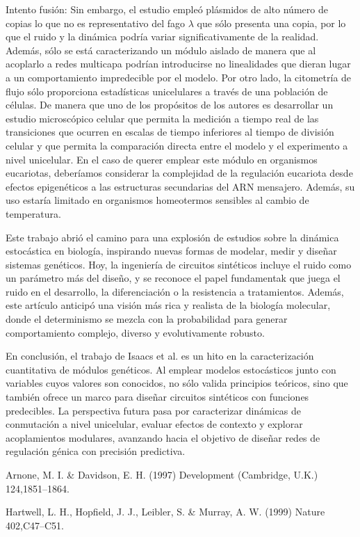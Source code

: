 \documentclass[nochap]{config/ejercicios}
\begin{document}
Intento fusión:
Sin embargo, el estudio empleó plásmidos de alto número de copias lo que no es representativo del fago $\lambda$ que sólo presenta una copia, por lo que el ruido y la dinámica podría variar significativamente de la realidad. Además, sólo se está caracterizando un módulo aislado de manera que al acoplarlo a redes multicapa podrían introducirse no linealidades que dieran lugar a un comportamiento impredecible por el modelo. Por otro lado, la citometría de flujo sólo proporciona estadísticas unicelulares a través de una población de células. De manera que uno de los propósitos de los autores es desarrollar un estudio microscópico celular que permita la medición a tiempo real de las transiciones que ocurren en escalas de tiempo inferiores al tiempo de división celular y que permita la comparación directa entre el modelo y el experimento a nivel unicelular. En el caso de querer emplear este módulo en organismos eucariotas, deberíamos considerar la complejidad de la regulación eucariota desde efectos epigenéticos a las estructuras secundarias del ARN mensajero. Además, su uso estaría limitado en organismos homeotermos sensibles al cambio de temperatura.


Este trabajo abrió el camino para una explosión de estudios sobre la dinámica estocástica en biología, inspirando nuevas formas de modelar, medir y diseñar sistemas genéticos. Hoy, la ingeniería de circuitos sintéticos incluye el ruido como un parámetro más del diseño, y se reconoce el papel fundamentak que juega el ruido en el desarrollo, la diferenciación o la resistencia a tratamientos. Además, este artículo anticipó una visión más rica y realista de la biología molecular, donde el determinismo se mezcla con la probabilidad para generar comportamiento complejo, diverso y evolutivamente robusto.


En conclusión, el trabajo de Isaacs et al. es un hito en la caracterización cuantitativa de módulos genéticos. Al emplear modelos estocásticos junto con variables cuyos valores son conocidos, no sólo valida principios teóricos, sino que también ofrece un marco para diseñar circuitos sintéticos con funciones predecibles. La perspectiva futura pasa por caracterizar dinámicas de conmutación a nivel unicelular, evaluar efectos de contexto y explorar acoplamientos modulares, avanzando hacia el objetivo de diseñar redes de regulación génica con precisión predictiva.


Arnone, M. I. \& Davidson, E. H. (1997) Development (Cambridge, U.K.) 124,1851–1864.

Hartwell, L. H., Hopfield, J. J., Leibler, S. \& Murray, A. W. (1999) Nature 402,C47–C51.
\end{document}
